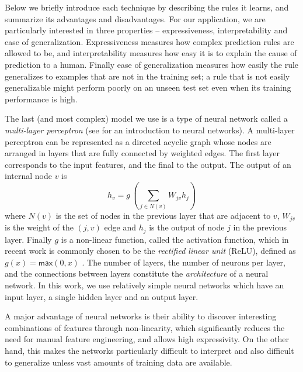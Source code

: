 Below we briefly introduce each technique by describing the rules it learns, and
summarize its advantages and disadvantages. For our application, we are
particularly interested in three properties -- expressiveness, interpretability
and ease of generalization. Expressiveness measures how complex prediction rules
are allowed to be, and interpretability measures how easy it is to explain the
cause of prediction to a human. Finally ease of generalization measures how
easily the rule generalizes to examples that are not in the training set; a rule
that is not easily generalizable might perform poorly on an unseen test set even
when its training performance is high.


The last (and most complex) model we use is a type of neural network called a
\emph{multi-layer perceptron} (see \citealt{Nielsen2015-pu} for an introduction
to neural networks). A multi-layer perceptron can be represented as a directed
acyclic graph whose nodes are arranged in layers that are fully connected by
weighted edges. The first layer corresponds to the input features, and the final
to the output.
The output of an internal node $v$ is
\[ h_v = g\,(\sum_{j \in N(v)}\!W_{jv} h_j ) \] where $N(v)$ is the set of nodes
in the previous layer that are adjacent to $v$, $W_{jv}$ is the weight of the
$(j, v)$ edge and $h_j$ is the output of node $j$ in the previous layer. Finally
$g$ is a non-linear function, called the activation function, which in recent
work is commonly chosen to be the \emph{rectified linear unit} (ReLU), defined
as $g(x) = \mathsf{max}(0,x)$ \citep{Nair2010-xg}. The number of layers, the
number of neurons per layer, and the connections between layers constitute the
\emph{architecture} of a neural network. In this work, we use relatively simple
neural networks which have an input layer, a single hidden layer and an output
layer.

A major advantage of neural networks is their ability to discover interesting
combinations of features through non-linearity, which significantly reduces the
need for manual feature engineering, and allows high expressivity. On the other
hand, this makes the networks particularly difficult to interpret and also
difficult to generalize unless vast amounts of training data are available.

\lstMakeShortInline[mathescape=true]{|}
